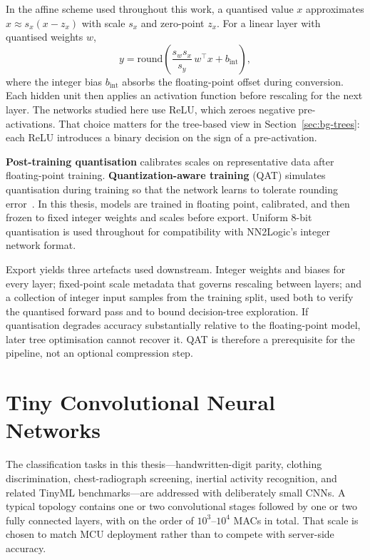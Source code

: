 In the affine scheme used throughout this work, a quantised value \(x\) approximates \(\hat{x} \approx s_x(x - z_x)\) with scale \(s_x\) and zero-point \(z_x\).
For a linear layer with quantised weights \(w\),
\[
  y = \mathrm{round}\!\left(\frac{s_w s_x}{s_y}\, w^\top x + b_\mathrm{int}\right),
\]
where the integer bias \(b_\mathrm{int}\) absorbs the floating-point offset during conversion.
Each hidden unit then applies an activation function before rescaling for the next layer.
The networks studied here use \ac{ReLU}, which zeroes negative pre-activations.
That choice matters for the tree-based view in Section~\ref{sec:bg-trees}: each \ac{ReLU} introduces a binary decision on the sign of a pre-activation.

\textbf{Post-training quantisation} calibrates scales on representative data after floating-point training.
\textbf{Quantization-aware training} (\ac{QAT}) simulates quantisation during training so that the network learns to tolerate rounding error~\cite{jacob2018quantization}.
In this thesis, models are trained in floating point, calibrated, and then frozen to fixed integer weights and scales before export.
Uniform 8-bit quantisation is used throughout for compatibility with NN2Logic's integer network format.

Export yields three artefacts used downstream.
Integer weights and biases for every layer; fixed-point scale metadata that governs rescaling between layers; and a collection of integer input samples from the training split, used both to verify the quantised forward pass and to bound decision-tree exploration.
If quantisation degrades accuracy substantially relative to the floating-point model, later tree optimisation cannot recover it.
\ac{QAT} is therefore a prerequisite for the pipeline, not an optional compression step.


\section{Tiny Convolutional Neural Networks}
\label{sec:bg-cnn}

The classification tasks in this thesis---handwritten-digit parity, clothing discrimination, chest-radiograph screening, inertial activity recognition, and related TinyML benchmarks---are addressed with deliberately small \acp{CNN}.
A typical topology contains one or two convolutional stages followed by one or two fully connected layers, with on the order of \(10^3\)--\(10^4\) \acp{MAC} in total.
That scale is chosen to match \ac{MCU} deployment rather than to compete with server-side accuracy.

